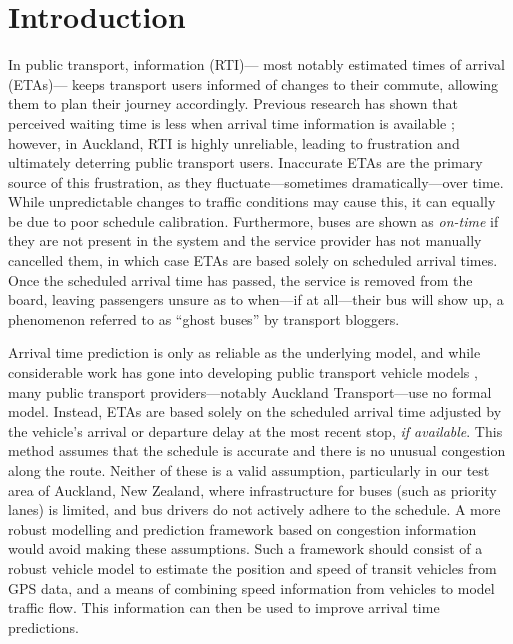 \section{Introduction}
\label{sec:intro}


In public transport, \rt information (RTI)---%
most notably estimated times of arrival (ETAs)---%
keeps transport users informed of changes to their commute,
allowing them to plan their journey accordingly.
Previous research has shown that perceived waiting time is less
when arrival time information is available \citep{TCRP_2003b};
however, in Auckland, RTI is highly unreliable,
leading to frustration and ultimately deterring public transport users.
Inaccurate ETAs are the primary source of this frustration,
as they fluctuate---sometimes dramatically---over time.
While unpredictable changes to traffic conditions may cause this,
it can equally be due to poor schedule calibration.
Furthermore, buses are shown as \emph{on-time} 
if they are not present in the \rt system and 
the service provider has not manually cancelled them,
in which case ETAs are based solely on scheduled arrival times.
Once the scheduled arrival time has passed,
the service is removed from the \rt board,
leaving passengers unsure as to when---if at all---their bus will show up,
a phenomenon referred to as ``ghost buses'' by transport bloggers.


Arrival time prediction is only as reliable as the underlying model,
and while considerable work has gone into developing public transport vehicle models
\citep{Cathey_2003,Jeong_2005,Yu_2011,Hans_2015},
many public transport providers---notably Auckland Transport---use no formal model.
Instead, ETAs are based solely on the scheduled arrival time
adjusted by the vehicle's arrival or departure delay at the most recent stop, 
\emph{if available}.
This method assumes that the schedule is accurate
and there is no unusual congestion along the route.
Neither of these is a valid assumption,
particularly in our test area of Auckland, New Zealand,
where infrastructure for buses (such as priority lanes) is limited,
and bus drivers do not actively adhere to the schedule.
A more robust modelling and prediction framework 
based on \rt congestion information would avoid making these assumptions.
Such a framework should consist of a robust vehicle model to estimate the position and speed
of transit vehicles from \rt GPS data,
and a means of combining speed information from vehicles
to model traffic flow.
This information can then be used to improve arrival time predictions.


